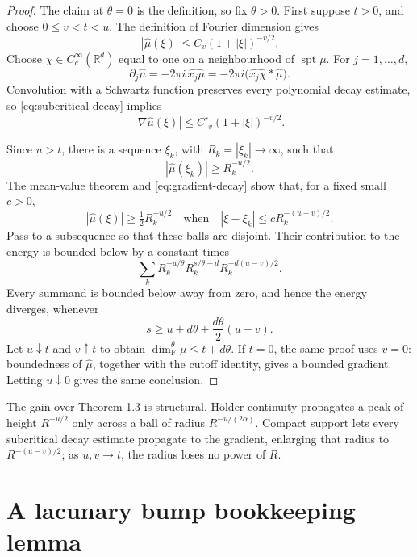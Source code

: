 \documentclass[11pt]{article}
\newcommand{\R}{\mathbb R}
\begin{document}
\begin{proof}
The claim at $\theta=0$ is the definition, so fix $\theta>0$. First
suppose $t>0$, and choose $0\le v<t<u$. The definition of Fourier
dimension gives
\begin{equation}\label{eq:subcritical-decay}
 |\widehat\mu(\xi)|\le C_v(1+|\xi|)^{-v/2}.
\end{equation}
Choose $\chi\in C_c^\infty(\R^d)$ equal to one on a neighbourhood of
\(\operatorname{spt}\mu\). For $j=1,\dots,d$,
\[
 \partial_j\widehat\mu=-2\pi i\,\widehat{x_j\mu}
 =-2\pi i\bigl(\widehat{x_j\chi}*\widehat\mu\bigr).
\]
Convolution with a Schwartz function preserves every polynomial decay
estimate, so \eqref{eq:subcritical-decay} implies
\begin{equation}\label{eq:gradient-decay}
 |\nabla\widehat\mu(\xi)|\le C'_v(1+|\xi|)^{-v/2}.
\end{equation}

Since $u>t$, there is a sequence $\xi_k$, with
\(R_k=|\xi_k|\to\infty\), such that
\[
 |\widehat\mu(\xi_k)|\ge R_k^{-u/2}.
\]
The mean-value theorem and \eqref{eq:gradient-decay} show that, for a fixed
small $c>0$,
\begin{equation}\label{eq:large-balls}
 |\widehat\mu(\xi)|\ge\tfrac12R_k^{-u/2}
 \quad\text{when}\quad
 |\xi-\xi_k|\le cR_k^{-(u-v)/2}.
\end{equation}
Pass to a subsequence so that these balls are disjoint. Their contribution
to the energy is bounded below by a constant times
\[
 \sum_k
 R_k^{-u/\theta}
 R_k^{s/\theta-d}
 R_k^{-d(u-v)/2}.
\]
Every summand is bounded below away from zero, and hence the energy
diverges, whenever
\[
 s\ge u+d\theta+\frac{d\theta}{2}(u-v).
\]
Let $u\downarrow t$ and $v\uparrow t$ to obtain
\(\dim_{\mathrm F}^{\theta}\mu\le t+d\theta\).
If $t=0$, the same proof uses $v=0$: boundedness of
\(\widehat\mu\), together with the cutoff identity, gives a bounded
gradient. Letting $u\downarrow0$ gives the same conclusion.
\end{proof}

The gain over Theorem 1.3 is structural. H\"older continuity propagates a
peak of height $R^{-u/2}$ only across a ball of radius
\(R^{-u/(2\alpha)}\). Compact support lets every subcritical decay estimate
propagate to the gradient, enlarging that radius to
\(R^{-(u-v)/2}\); as $u,v\to t$, the radius loses no power of $R$.

\section{A lacunary bump bookkeeping lemma}
\end{document}
